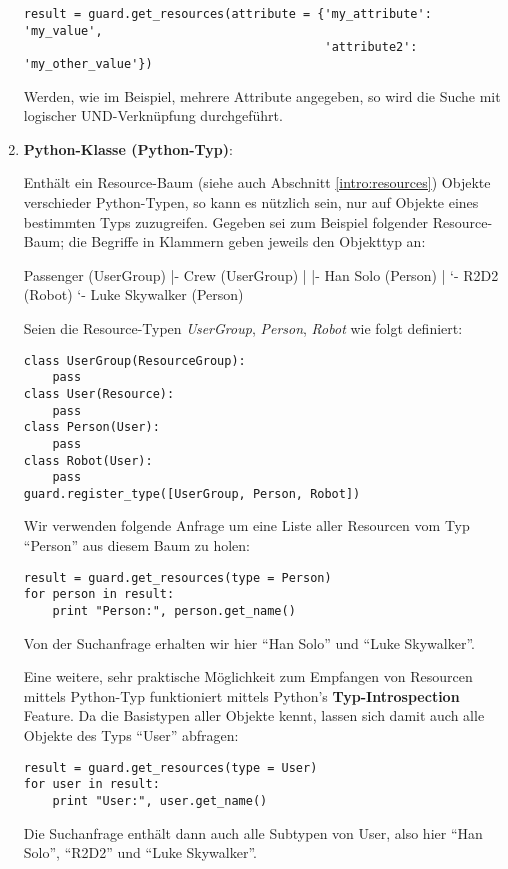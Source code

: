 \begin{enumerate}
\begin{lstlisting}
result = guard.get_resources(attribute = {'my_attribute': 'my_value',
                                          'attribute2':   'my_other_value'})
\end{lstlisting}

Werden, wie im Beispiel, mehrere Attribute angegeben, so wird die Suche mit 
logischer UND-Verknüpfung durchgeführt.

\item {\bf Python-Klasse (Python-Typ)}: 

Enthält ein Resource-Baum (siehe auch Abschnitt \ref{intro:resources}) 
Objekte verschieder Python-Typen, so kann es nützlich sein, nur 
auf Objekte eines bestimmten Typs zuzugreifen. Gegeben sei zum Beispiel 
folgender Resource-Baum; die Begriffe in Klammern geben jeweils den 
Objekttyp an:

\begin{indentverb}
Passenger (UserGroup)
  |- Crew (UserGroup)
  |   |- Han Solo (Person)
  |   `- R2D2 (Robot)
  `- Luke Skywalker (Person)
\end{indentverb}

Seien die Resource-Typen {\it UserGroup}, {\it Person}, {\it Robot} wie 
folgt definiert:

\begin{lstlisting}
class UserGroup(ResourceGroup):
    pass
class User(Resource):
    pass
class Person(User):
    pass
class Robot(User):
    pass
guard.register_type([UserGroup, Person, Robot])
\end{lstlisting}

Wir verwenden folgende Anfrage um eine Liste aller Resourcen vom Typ 
``Person'' aus diesem Baum zu holen:

\begin{lstlisting}
result = guard.get_resources(type = Person)
for person in result:
    print "Person:", person.get_name()
\end{lstlisting}

Von der Suchanfrage erhalten wir hier ``Han Solo'' und ``Luke Skywalker''.

Eine weitere, sehr praktische Möglichkeit zum Empfangen von Resourcen 
mittels Python-Typ funktioniert mittels Python's {\bf Typ-Introspection} 
Feature. Da \product die Basistypen aller Objekte kennt, lassen sich 
damit auch alle Objekte des Typs ``User'' abfragen:

\begin{lstlisting}
result = guard.get_resources(type = User)
for user in result:
    print "User:", user.get_name()
\end{lstlisting}

Die Suchanfrage enthält dann auch alle Subtypen von User, also hier 
``Han Solo'', ``R2D2'' und ``Luke Skywalker''.
\end{enumerate}


